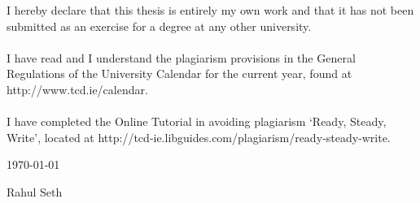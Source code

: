 I hereby declare that this thesis is entirely my own work and that it has not been submitted as an exercise for a degree at any other
university.\\\\
I have read and I understand the plagiarism provisions in the General 
Regulations of the University Calendar for the current year, found at 
http://www.tcd.ie/calendar.\\\\
I have completed the Online Tutorial in avoiding plagiarism ‘Ready, Steady, 
Write’, located at http://tcd‐ie.libguides.com/plagiarism/ready‐steady‐write.

\begin{center}
\vspace*{2in}

\underline{\hspace*{3in}} \today

Rahul Seth
\end{center}
